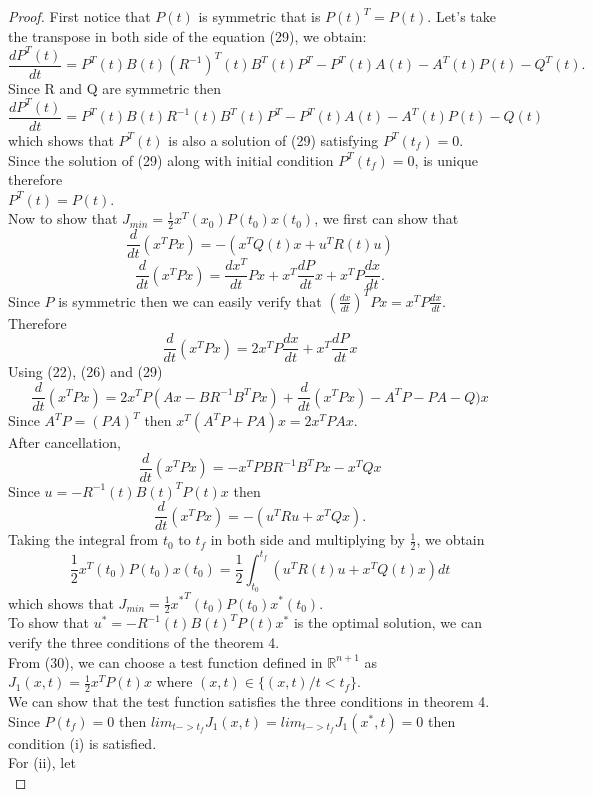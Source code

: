\documentclass[12pt]{article}
\begin{document}
\begin{proof}

First notice that $P(t)$ is symmetric that is $P(t)^T=P(t)$.
Let's take the transpose in both side of the equation (29), we obtain:\\
$$\frac{dP^T(t)}{dt}=P^T(t)B(t)({R^{-1}})^T(t)B^T(t)P^T-P^T(t)A(t)-A^T(t)P(t)-Q^T(t).$$
Since R and Q are symmetric then
$$\frac{dP^T(t)}{dt}=P^T(t)B(t)R^{-1}(t)B^T(t)P^T-P^T(t)A(t)-A^T(t)P(t)-Q(t)$$
which shows that $P^T(t)$ is also a solution of (29) satisfying $P^T(t_f)=0$.\\
Since the solution of (29) along with initial condition $ P^T(t_f)=0$, is
unique therefore\\
$P^T(t)=P(t)$.\\
Now to show that $J_{min}=\frac{1}{2}x^T(x_0)P(t_0)x(t_0)$, we first can show that 
$$\frac{d}{dt}(x^TPx)=-(x^TQ(t)x+u^TR(t)u)$$
$$\frac{d}{dt}(x^TPx)=\frac{dx^T}{dt}Px+x^T\frac{dP}{dt}x+x^TP\frac{dx}{dt}.$$
Since $P$ is symmetric then we can easily verify that $(\frac{dx}{dt})^TPx=x^TP\frac{dx}{dt}$.\\
Therefore $$\frac{d}{dt}(x^TPx)=2x^TP\frac{dx}{dt}+x^T\frac{dP}{dt}x$$
Using (22), (26) and (29)
$$\frac{d}{dt}(x^TPx)=2x^TP(Ax-BR^{-1}B^TPx)+\frac{d}{dt}(x^TPx)-A^TP-PA-Q)x$$
Since $A^TP=(PA)^T$  then $x^T(A^TP+PA)x=2x^TPAx$.\\
After cancellation,
$$\frac{d}{dt}(x^TPx)=-x^TPBR^{-1}B^TPx-x^TQx$$
Since $u=-R^{-1}(t)B(t)^TP(t)x$ then 
$$\frac{d}{dt}(x^TPx)=-(u^TRu+x^TQx).$$
Taking the integral from $t_0$ to $t_f$ in both side and multiplying by $\frac{1}{2}$, we obtain
\begin {equation}
\frac{1}{2}x^T(t_0)P(t_0)x(t_0)=\frac{1}{2}\int_{t_0}^{t_f}(u^TR(t)u+x^TQ(t)x)dt
\end{equation}
which shows that $J_{min}=\frac{1}{2}{x^*}^T(t_0)P(t_0)x^*(t_0).$\\
To show that $u^*=-R^{-1}(t)B(t)^TP(t)x^*$ is the optimal solution, we can verify the three conditions  of the theorem 4.\\
From (30), we can choose a test function defined in ${\mathbb R}^{n+1}$
as $J_1(x,t)=\frac{1}{2}x^TP(t)x$ where $(x,t)\in \{(x,t)/ t<t_f\}.$\\
We can show that the test function satisfies the three conditions in  theorem 4.\\
Since $P(t_f)=0$ then $lim_{t->t_f}J_1(x,t)=lim_{t->t_f}J_1(x^*,t)=0$ then 
condition (i) is satisfied.\\
For (ii), let\\

\end{proof}
\end{document}
